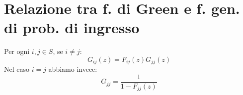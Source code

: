 \documentclass[\main/main.tex]{subfiles}
\begin{document}
\section{Relazione tra f. di Green e f. gen. di prob. di ingresso}
\begin{theorem}
  Per ogni \(i, j \in S\), se \(i\neq j\):
  \[
    G_{ij}(z) = F_{ij}(z) G_{jj}(z)
  \]
  Nel caso \(i=j\) abbiamo invece:
  \[
    G_{jj} = \frac{1}{1 - F_{jj}(z)}
  \]
\end{theorem}
\end{document}

